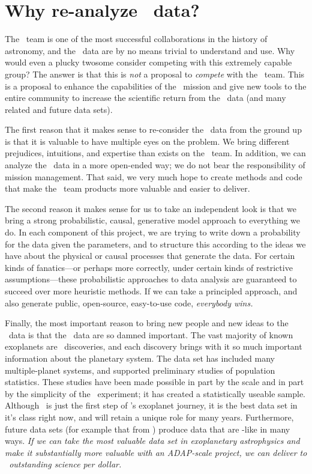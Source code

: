 \documentclass[letterpaper,12pt,preprint]{hack_aastex}
\begin{document}
\section{Why re-analyze \Kepler\ data?}

The \Kepler\ team is one of the most successful collaborations in the
history of astronomy, and the \Kepler\ data are by no means trivial to
understand and use.  Why would even a plucky twosome consider
competing with this extremely capable group?  The answer is that this
is \emph{not} a proposal to \emph{compete} with the \Kepler\ team.
This is a proposal to enhance the capabilities of the \Kepler\ mission
and give new tools to the entire community to increase the scientific
return from the \Kepler\ data (and many related and future data sets).

The first reason that it makes sense to re-consider the \Kepler\ data
from the ground up is that it is valuable to have
multiple eyes on the problem.  We bring different prejudices,
intuitions, and expertise than exists on the
\Kepler\ team.  In addition, we can analyze the \Kepler\ data in a
more open-ended way; we do not bear the responsibility of
mission management.
That said, we very much hope to create methods and code that make the
\Kepler\ team products more valuable and easier to deliver.

The second reason it makes sense for us to take an independent look
is that we bring a strong probabilistic,
causal, generative model approach to everything we do.  In each
component of this project, we are trying to write down a probability
for the data given the parameters, and to structure this
according to
the ideas we have about the physical or causal processes that
generate the data.  For certain kinds of fanatics---or
perhaps more correctly, under certain kinds of restrictive
assumptions---these probabilistic approaches to data analysis are
guaranteed to succeed over more heuristic methods.
If we can take a principled approach, and also
generate public, open-source, easy-to-use code,
\emph{everybody wins.}

Finally, the most important reason to bring new people and new ideas
to the \Kepler\ data is that the \Kepler\ data are so damned
important.  The vast majority of known exoplanets are
\Kepler\ discoveries, and each discovery brings with
it so much important information about the planetary system.
The data set has included many multiple-planet systems, and supported
preliminary studies of population statistics.  These studies have been made
possible in part by the scale and in part by the simplicity of the
\Kepler\ experiment; it has created a statistically useable sample.
Although \Kepler\ is just the first step of \NASA's exoplanet journey,
it is the best data set in it's class right now, and will retain
a unique role for many years.  Furthermore, future
data sets (for example that from \TESS) produce data that are
\Kepler-like in many ways.  \emph{If we can take the most valuable
  data set in exoplanetary astrophysics and make it substantially more
  valuable with an ADAP-scale project, we can deliver to
  \NASA\ outstanding science per dollar.}
\end{document}
